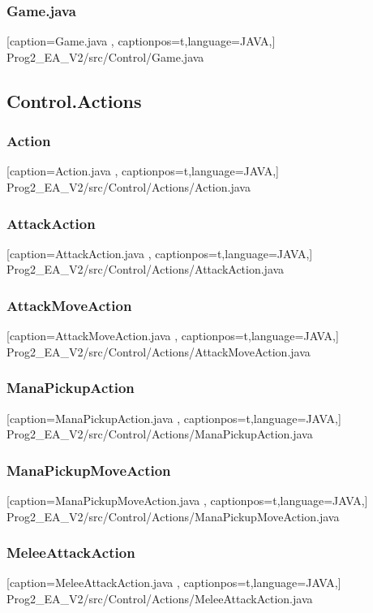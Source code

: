 \documentclass[a4paper,12pt]{scrartcl}
\begin{document}
	\subsubsection{Game.java}
	
	[caption={Game.java}
	\label{lst:javaclass},
	captionpos=t,language=JAVA,]
	{Prog2_EA_V2/src/Control/Game.java}
	\subsection{Control.Actions}
	\subsubsection{Action}
	
	[caption={Action.java}
	\label{lst:javaclass},
	captionpos=t,language=JAVA,]
	{Prog2_EA_V2/src/Control/Actions/Action.java}
	\subsubsection{AttackAction}
	
	[caption={AttackAction.java}
	\label{lst:javaclass},
	captionpos=t,language=JAVA,]
	{Prog2_EA_V2/src/Control/Actions/AttackAction.java}
	\subsubsection{AttackMoveAction}
	
	[caption={AttackMoveAction.java}
	\label{lst:javaclass},
	captionpos=t,language=JAVA,]
	{Prog2_EA_V2/src/Control/Actions/AttackMoveAction.java}
	\subsubsection{ManaPickupAction}
	
	[caption={ManaPickupAction.java}
	\label{lst:javaclass},
	captionpos=t,language=JAVA,]
	{Prog2_EA_V2/src/Control/Actions/ManaPickupAction.java}
	\subsubsection{ManaPickupMoveAction}
	
	[caption={ManaPickupMoveAction.java}
	\label{lst:javaclass},
	captionpos=t,language=JAVA,]
	{Prog2_EA_V2/src/Control/Actions/ManaPickupMoveAction.java}
	\subsubsection{MeleeAttackAction}
	
	[caption={MeleeAttackAction.java}
	\label{lst:javaclass},
	captionpos=t,language=JAVA,]
	{Prog2_EA_V2/src/Control/Actions/MeleeAttackAction.java}
\end{document}
